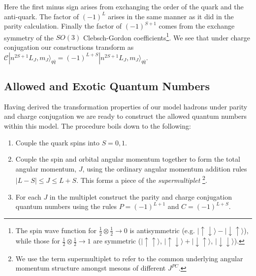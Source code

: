 Here the first minus sign arises from exchanging the order of the quark and the anti-quark. The factor of $(-1)^L$ arises in the same manner as it did in the parity calculation. Finally the factor of $(-1)^{S+1}$ comes from the exchange symmetry of the $SO(3)$ Clebsch-Gordon coefficients\footnote{The spin wave function for $\frac{1}{2}\otimes \frac{1}{2} \rightarrow 0$ is antisymmetric (e.g. $|\!\!\uparrow\downarrow\rangle - |\!\!\downarrow\uparrow\rangle$), while those for $\frac{1}{2}\otimes \frac{1}{2} \rightarrow 1$ are symmetric ($|\!\!\uparrow\uparrow\rangle$, $|\!\!\uparrow\downarrow\rangle + |\!\!\downarrow\uparrow\rangle$, $|\!\!\downarrow\downarrow\rangle$).}. We see that under charge conjugation our constructions transform as  $\mathcal{C} | n^{2S+1}L_J , m_J \rangle_{q\bar{q}}  = (-1)^{L+S} | n^{2S+1}L_J , m_J \rangle_{q\bar{q}}$.

\subsection{Allowed and Exotic Quantum Numbers}
Having derived the transformation properties of our model hadrons under parity and charge conjugation we are ready to construct the allowed quantum numbers within this model. The procedure boils down to the following: 

\begin{enumerate}
\item Couple the quark spins into $S=0,1$.  
\item Couple the spin and orbital angular momentum together to form the total angular momentum, $J$, using the ordinary angular momentum addition rules $ | L - S | \leq J \leq L + S$. This forms a piece of the \emph{supermultiplet} \footnote{We use the term supermultiplet to refer to the common underlying angular momentum structure amongst mesons of different $J^{PC}$.}.  
\item For each $J$ in the multiplet construct the parity and charge conjugation quantum numbers using the rules $P = (-1)^{L+1}$ and $C=(-1)^{L+S}$. 
\end{enumerate}

